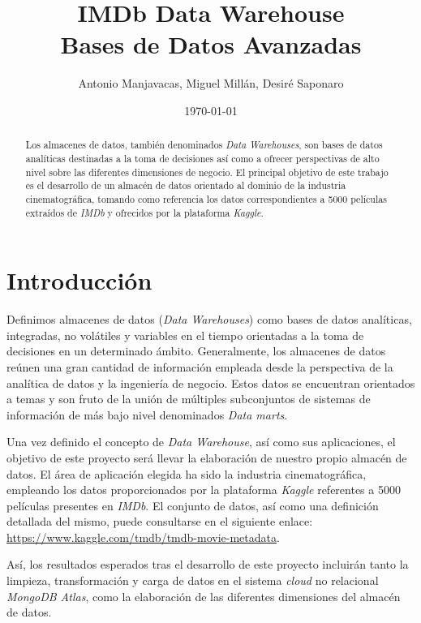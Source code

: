 \documentclass[11pt,a4paper]{article}
\author{Antonio Manjavacas, Miguel Millán, Desiré Saponaro}
\title{\textbf{IMDb Data Warehouse} \\ Bases de Datos Avanzadas}
\date{\today}
\begin{document}
\maketitle

\begin{abstract}

Los almacenes de datos, también denominados \textit{Data Warehouses}, son bases de datos analíticas destinadas a la toma de decisiones así como a ofrecer perspectivas de alto nivel sobre las diferentes dimensiones de negocio. El principal objetivo de este trabajo es el desarrollo de un almacén de datos orientado al dominio de la industria cinematográfica, tomando como referencia los datos correspondientes a 5000 películas extraídos de \textit{IMDb} y ofrecidos por la plataforma \textit{Kaggle}.

\end{abstract}

\tableofcontents

\section{Introducción}

Definimos almacenes de datos (\textit{Data Warehouses}) como bases de datos analíticas, integradas, no volátiles y variables en el tiempo orientadas a la toma de decisiones en un determinado ámbito. Generalmente, los almacenes de datos reúnen una gran cantidad de información empleada desde la perspectiva de la analítica de datos y la ingeniería de negocio. Estos datos se encuentran orientados a temas y son fruto de la unión de múltiples subconjuntos de sistemas de información de más bajo nivel denominados \textit{Data marts}.

Una vez definido el concepto de \textit{Data Warehouse}, así como sus aplicaciones, el objetivo de este proyecto será llevar la elaboración de nuestro propio almacén de datos. El área de aplicación elegida ha sido la industria cinematográfica, empleando los datos proporcionados por la plataforma \textit{Kaggle} referentes a 5000 películas presentes en \textit{IMDb}. El conjunto de datos, así como una definición detallada del mismo, puede consultarse en el siguiente enlace: \url{https://www.kaggle.com/tmdb/tmdb-movie-metadata}.

Así, los resultados esperados tras el desarrollo de este proyecto incluirán tanto la limpieza, transformación y carga de datos en el sistema \textit{cloud} no relacional \textit{MongoDB Atlas}, como la elaboración de las diferentes dimensiones del almacén de datos.
\end{document}
